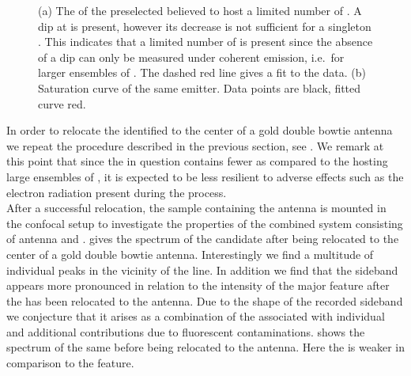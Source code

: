 \begin{figure}[htp]
\begin{subfigure}[t]{ 0.49\linewidth}
						\caption{}
						\label{subfig::single_siv_sat_before_transfer_antenna}
					\end{subfigure}
					\caption[Properties of a \nd containing a few \sivs]{(a) The \gtf of the preselected \nd believed to host a limited number of \sivs. A dip at \gtz is present, however its decrease is not sufficient for a singleton \siv. This indicates that a limited number of \sivs is present since the absence of a dip can only be measured under coherent emission, i.e.\ for larger ensembles of \sivs. The dashed red line gives a fit to the data. (b) Saturation curve of the same emitter. Data points are black, fitted curve red.}
				\end{figure}

				In order to relocate the identified \nd to the center of a gold double bowtie antenna we repeat the \pp procedure described in the previous section, see . We remark at this point that since the \nd in question contains fewer \sivs as compared to the \nds hosting large ensembles of \sivs, it is expected to be less resilient to adverse effects such as the electron radiation present during the \pp process.
				\\
				After a successful relocation, the sample containing the antenna is mounted in the confocal setup to investigate the properties of the combined system consisting of antenna and \sivs.  gives the spectrum of the candidate \nd after being relocated to the center of a gold double bowtie antenna. Interestingly we find a multitude of individual peaks in the vicinity of the \siv \zpl line. In addition we find that the sideband appears more pronounced in relation to the intensity of the major feature after the \nd has been relocated to the antenna. Due to the shape of the recorded sideband we conjecture that it arises as a combination of the \psbs associated with individual \sivs and additional contributions due to fluorescent contaminations.  shows the spectrum of the same \nd before being relocated to the antenna. Here the \psb is weaker in comparison to the \zpl feature.


